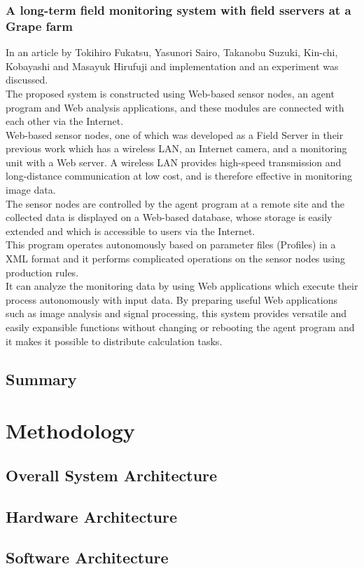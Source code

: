 \documentclass[12pt, a4paper]{article}
\begin{document}
\subsubsection{A long-term field monitoring system with field sservers at a Grape farm}
In an article \cite{firsttest} by Tokihiro Fukatsu, Yasunori Sairo, Takanobu Suzuki, Kin-chi, Kobayashi and Masayuk Hirufuji and  implementation and an experiment was discussed.\\
The proposed system is constructed using Web-based sensor nodes, an agent program and Web analysis applications, and these modules are connected with each other via the Internet.\\ 
Web-based sensor nodes, one of which was developed as a Field Server in their previous work which has a wireless LAN, an Internet camera, and a monitoring unit with a Web server. A wireless LAN provides high-speed transmission and long-distance communication at low cost, and is therefore effective in monitoring image data.\\
The sensor nodes are controlled by the agent program at a remote site and the collected data is displayed on a Web-based database, whose storage is easily extended and which is accessible to users via the Internet.\\ 
This program operates autonomously based on parameter files (Profiles) in a XML format and it performs complicated operations on the sensor nodes using production rules.\\
It can analyze the monitoring data by using Web applications which execute their process autonomously with input data. By preparing useful Web applications such as image analysis and signal processing, this system provides versatile and easily expansible functions without changing or rebooting the agent program and it makes it possible to distribute calculation tasks.
\subsection{Summary}
\newpage

\section{Methodology}
\subsection{Overall System Architecture}
\subsection{Hardware Architecture}
\subsection{Software Architecture}

\newpage



\end{document}
